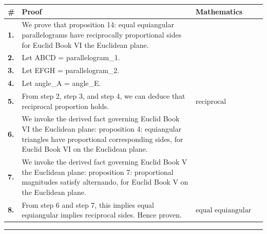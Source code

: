 \documentclass[11pt]{article}
\theoremstyle{definition}
\begin{document}
\begin{tabular}{@{} >{\raggedright\arraybackslash}p{} >{\raggedright\arraybackslash}p{} >{\raggedleft\arraybackslash}p{} @{}}
\textbf{\#} & \textbf{Proof} & \textbf{Mathematics} \\
\midrule
\textbf{1.} & We prove that proposition 14: equal equiangular parallelograms have reciprocally proportional sides for Euclid Book VI the Euclidean plane. & \\[0.45em]
\textbf{2.} & Let ABCD = parallelogram\_1. & \\[0.45em]
\textbf{3.} & Let EFGH = parallelogram\_2. & \\[0.45em]
\textbf{4.} & Let angle\_A = angle\_E. & \\[0.45em]
\textbf{5.} & From step 2, step 3, and step 4, we can deduce that reciprocal proportion holds. & $\displaystyle \text{reciprocal proportion holds}$ \\[0.45em]
\textbf{6.} & We invoke the derived fact governing Euclid Book VI the Euclidean plane: proposition 4: equiangular triangles have proportional corresponding sides, for Euclid Book VI on the Euclidean plane. & \\[0.45em]
\textbf{7.} & We invoke the derived fact governing Euclid Book V the Euclidean plane: proposition 7: proportional magnitudes satisfy alternando, for Euclid Book V on the Euclidean plane. & \\[0.45em]
\textbf{8.} & From step 6 and step 7, this implies equal equiangular implies reciprocal sides. Hence proven. & $\displaystyle \text{equal equiangular implies reciprocal sides}$ \\[0.45em]
\bottomrule
\end{tabular}
\label{thm:Geometry-Euclid Book VI-proposition_14_equal_equiangular_parallelograms_have_reciprocally_proportional_sides}
\par\medskip\hrule
\end{document}
